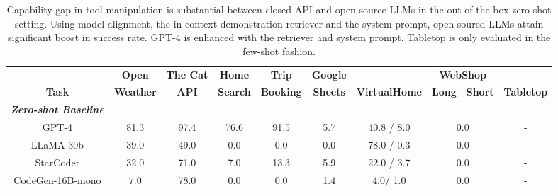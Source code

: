 \begin{table}[]
\caption{Capability gap in tool manipulation is substantial between closed API and open-source LLMs in the out-of-the-box zero-shot setting. Using model alignment, the in-context demonstration retriever and the system prompt, open-soured LLMs attain significant boost in success rate. GPT-4 is enhanced with the retriever and system prompt.
Tabletop is only evaluated in the few-shot fashion. 
}
\label{tab:baselines}
\begin{adjustbox}{max width=\textwidth}

\setlength{\tabcolsep}{4pt}
\begin{tabular}{@{}cccccccccc@{}}
\toprule
                                          & \textbf{Open}                           & \textbf{The Cat}                    & \textbf{Home}        & \textbf{Trip}        & \textbf{Google}      &                                        & \multicolumn{2}{c}{\textbf{WebShop}}        &                                     \\
\multirow{-2}{*}{\textbf{Task}}           & {\color[HTML]{1F1F1F} \textbf{Weather}} & {\color[HTML]{1F1F1F} \textbf{API}} & \textbf{Search}      & \textbf{Booking}     & \textbf{Sheets}      & \multirow{-2}{*}{\textbf{VirtualHome}} & \textbf{Long}        & \textbf{Short}       & \multirow{-2}{*}{\textbf{Tabletop}} \\
\midrule
\textit{\textbf{Zero-shot Baseline}}      & \multicolumn{1}{l}{}                    & \multicolumn{1}{l}{}                & \multicolumn{1}{l}{} & \multicolumn{1}{l}{} & \multicolumn{1}{l}{} & \multicolumn{1}{l}{}                   & \multicolumn{1}{l}{} & \multicolumn{1}{l}{} & \multicolumn{1}{l}{}                \\
GPT-4                                          & 81.3            & 97.4            & 76.6            & 91.5            & 5.7             & 40.8 / 8.0  & \multicolumn{2}{c}{0.0}                    & -                    \\
LLaMA-30b                                     & 39.0            & 49.0            & 0.0             & 0.0            & 0.0             & 78.0 / 0.3  & \multicolumn{2}{c}{0.0}                    & -                    \\
StarCoder                                     & 32.0            & 71.0            & 7.0             & 13.3            & 5.9             & 22.0 / 3.7  & \multicolumn{2}{c}{0.0}                    & -                    \\
CodeGen-16B-mono                              & 7.0           & 78.0            & 0.0             & 0.0            & 1.4             & 4.0/ 1.0  & \multicolumn{2}{c}{0.0}                    & -                    \\


\end{tabular}
\end{adjustbox}
\end{table}
